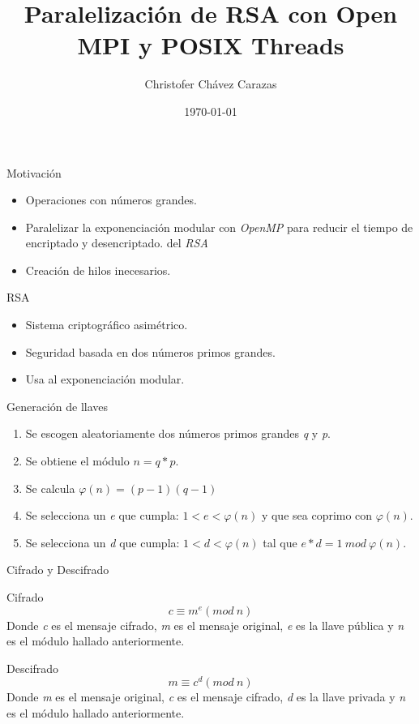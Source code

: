 \documentclass{beamer}
\title{Paralelización de RSA con Open MPI y POSIX Threads}
\author{Christofer Chávez Carazas}
\institute[Universidad Nacional de San Agustín]
\date{\today}
\begin{document}
\begin{frame}
  \titlepage
\end{frame}

\begin{frame}{Motivación}
  \begin{itemize}
   \item Operaciones con números grandes.
   \item Paralelizar la exponenciación modular con \textit{OpenMP} para reducir el tiempo de encriptado y desencriptado.
   del \textit{RSA}
   \item Creación de hilos inecesarios.
  \end{itemize}
\end{frame}


\begin{frame}{RSA}
 \begin{itemize}
  \item Sistema criptográfico asimétrico.
  \item Seguridad basada en dos números primos grandes.
  \item Usa al exponenciación modular.
 \end{itemize}
\end{frame}

\begin{frame}{Generación de llaves}
  \begin{enumerate}
   \item Se escogen aleatoriamente dos números primos grandes \textit{q} y \textit{p}.
   \item Se obtiene el módulo $n = q * p$.
   \item Se calcula  $\varphi(n) = (p-1)(q-1)$
   \item Se selecciona un \textit{e} que cumpla: $1 < e < \varphi(n)$ y que sea coprimo con $\varphi(n)$.
   \item Se selecciona un \textit{d} que cumpla: $1 < d < \varphi(n)$ tal que $e*d = 1\:mod\:\varphi(n)$.
  \end{enumerate}
\end{frame}

\begin{frame}{Cifrado y Descifrado}
  \begin{block}{Cifrado}
    $$c \equiv m^{e} (mod\:n)$$ 
    Donde \textit{c} es el mensaje cifrado, \textit{m} es el mensaje original, \textit{e} es la llave pública y
    \textit{n} es el módulo hallado anteriormente.
  \end{block}
  \begin{block}{Descifrado}
   $$m \equiv c^{d} (mod\:n)$$
   Donde \textit{m} es el mensaje original, \textit{c} es el mensaje cifrado, \textit{d} es la llave privada y
   \textit{n} es el módulo hallado anteriormente.
  \end{block}
\end{frame}
\end{document}
